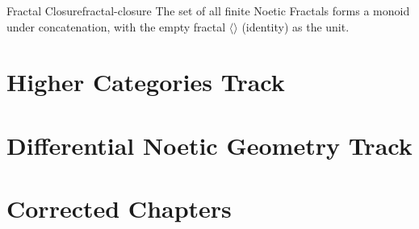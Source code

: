 \documentclass[11pt,twoside,openright]{book}
\theoremstyle{definition}
\theoremstyle{plain}
\theoremstyle{remark}
\begin{document}
\begin{theorembox*}{Fractal Closure}{fractal-closure}
The set of all finite Noetic Fractals forms a monoid under concatenation, with the empty fractal $\langle \rangle$ (identity) as the unit.
\end{theorembox*}

\part{Higher Categories Track}
\label{part:higher-categories}



\part{Differential Noetic Geometry Track}
\label{part:geometry}



\part{Corrected Chapters}
\label{part:corrected}




\end{document}
